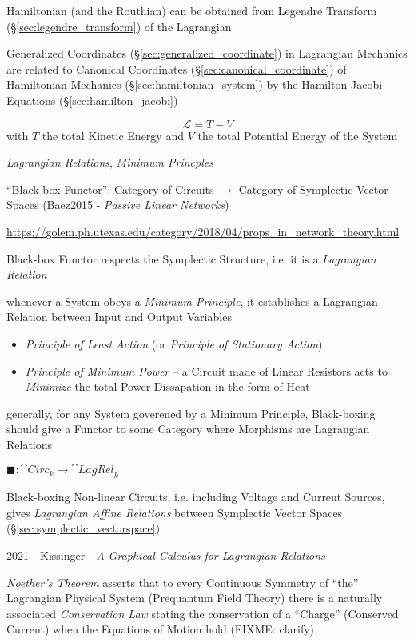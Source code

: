 Hamiltonian (and the Routhian) can be obtained from Legendre Transform
(\S\ref{sec:legendre_transform}) of the Lagrangian

Generalized Coordinates (\S\ref{sec:generalized_coordinate}) in Lagrangian
Mechanics are related to Canonical Coordinates
(\S\ref{sec:canonical_coordinate}) of Hamiltonian Mechanics
(\S\ref{sec:hamiltonian_system}) by the Hamilton-Jacobi Equations
(\S\ref{sec:hamilton_jacobi})

\[
  \mathcal{L} = T - V
\]
with $T$ the total Kinetic Energy and $V$ the total Potential Energy of the
System

\emph{Lagrangian Relations}, \emph{Minimum Princples}

``Black-box Functor'': Category of Circuits $\rightarrow$ Category of
Symplectic Vector Spaces (Baez2015 - \emph{Passive Linear Networks})

\url{https://golem.ph.utexas.edu/category/2018/04/props_in_network_theory.html}

Black-box Functor respects the Symplectic Structure, i.e. it is a
\emph{Lagrangian Relation}

whenever a System obeys a \emph{Minimum Principle}, it establishes a Lagrangian
Relation between Input and Output Variables

\begin{itemize}
  \item \emph{Principle of Least Action} (or \emph{Principle of Stationary
    Action})
  \item \emph{Principle of Minimum Power} -- a Circuit made of Linear Resistors
    acts to \emph{Minimize} the total Power Dissapation in the form of Heat
\end{itemize}

generally, for any System goverened by a Minimum Principle, Black-boxing should
give a Functor to some Category where Morphisms are Lagrangian Relations

$\blacksquare : \cat{Circ}_k \rightarrow \cat{LagRel}_k$

Black-boxing Non-linear Circuits, i.e. including Voltage and Current Sources,
gives \emph{Lagrangian Affine Relations} between Symplectic Vector Spaces
(\S\ref{sec:symplectic_vectorspace})

2021 - Kissinger - \emph{A Graphical Calculus for Lagrangian Relations}

\asterism

\emph{Noether's Theorem} asserts that to every Continuous Symmetry of ``the''
Lagrangian Physical System (Prequantum Field Theory) there is a naturally
associated \emph{Conservation Law} stating the conservation of a ``Charge''
(Conserved Current) when the Equations of Motion hold (FIXME: clarify)

